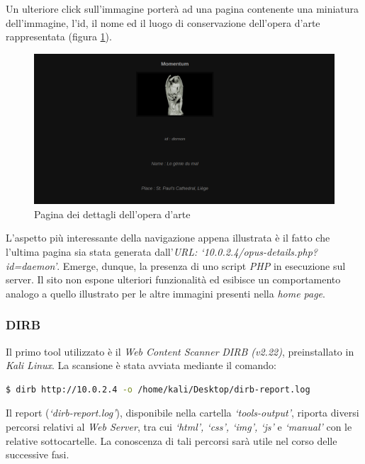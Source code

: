 Un ulteriore click sull'immagine porterà ad una pagina contenente una miniatura dell'immagine, l'id, il nome ed il luogo di conservazione dell'opera d'arte rappresentata (figura \ref{fig:img_details}). 
\begin{figure}[h]
    \centering
    \includegraphics[scale=0.5]{capitoli/images/img_details.png}
    \caption{Pagina dei dettagli dell'opera d'arte}
    \label{fig:img_details}
\end{figure}
L'aspetto più interessante della navigazione appena illustrata è il fatto che l'ultima pagina sia stata generata dall'\emph{URL: `10.0.2.4/opus-details.php?id=daemon'}. Emerge, dunque, la presenza di uno script \emph{PHP} in esecuzione sul server. Il sito non espone ulteriori funzionalità ed esibisce un comportamento analogo a quello illustrato per le altre immagini presenti nella \emph{home page}.
\subsubsection{DIRB}
Il primo tool utilizzato è il \emph{Web Content Scanner} \emph{DIRB (v2.22)}, preinstallato in \emph{Kali Linux}. La scansione è stata avviata mediante il comando:
\begin{lstlisting}[language=bash]
    $ dirb http://10.0.2.4 -o /home/kali/Desktop/dirb-report.log 
\end{lstlisting}
Il report (\emph{`dirb-report.log'}), disponibile nella cartella \emph{`tools-output'}, riporta diversi percorsi relativi al \emph{Web Server}, tra cui \emph{`html', `css', `img', `js'} e \emph{`manual'} con le relative sottocartelle. La conoscenza di tali percorsi sarà utile nel corso delle successive fasi.
